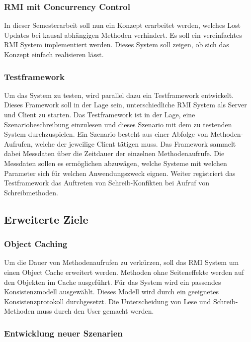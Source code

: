\documentclass{article}
\begin{document}
\subsubsection{RMI mit Concurrency Control}
\label{sec:rmi-mit-concurrency}

In dieser Semesterarbeit soll nun ein Konzept erarbeitet werden, welches Lost Updates bei kausal abhängigen Methoden verhindert.  Es soll ein vereinfachtes RMI System implementiert werden. Dieses System soll zeigen, ob sich das Konzept einfach realisieren lässt.

\subsubsection{Testframework}
\label{sec:testframework}

Um das System zu testen, wird parallel dazu ein Testframework entwickelt. Dieses Framework soll in der Lage sein, unterschiedliche RMI System als Server und Client zu starten. Das Testframework ist in der Lage, eine Szenariobeschreibung einzulesen und dieses Szenario mit dem zu testenden System durchzuspielen. Ein Szenario besteht aus einer Abfolge von Methoden-Aufrufen, welche der jeweilige Client tätigen muss. Das Framework sammelt dabei Messdaten über die Zeitdauer der einzelnen Methodenaufrufe. Die Messdaten sollen es ermöglichen abzuwägen, welche Systeme mit welchen Parameter sich für welchen Anwendungszweck eignen.
Weiter registriert das Testframework das Auftreten von Schreib-Konfikten bei Aufruf von Schreibmethoden.

\subsection{Erweiterte Ziele}
\label{sec:erweiterte-ziele}

\subsubsection{Object Caching}
\label{sec:object-caching}

Um die Dauer von Methodenaufrufen zu verkürzen, soll das RMI System um einen Object Cache erweitert werden. Methoden ohne Seiteneffekte werden auf den Objekten im Cache ausgeführt. Für das System wird ein passendes Konsistenzmodell ausgewählt. Dieses Modell wird durch ein geeignetes Konsistenzprotokoll durchgesetzt. Die Unterscheidung von Lese und Schreib- Methoden muss durch den User gemacht werden.

\subsubsection{Entwicklung neuer Szenarien}
\label{sec:entwicklung-neuer-szenarien}
\end{document}
